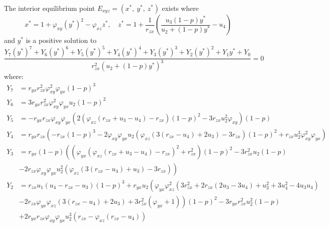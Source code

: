 \begin{theorem}\label{thm:eq-interior-exist}
    The interior equilibrium point $E_{xyz}=\left(x^*,\ y^*,\ z^*\right)$ exists where
    \begin{equation*}
        x^*=1+\varphi_{xy}\left(y^*\right)^2-\varphi_{xz}z^*,\quad 
        z^*=1+\frac{1}{r_{zx}}\left(\frac{u_3\left(1-p\right)y^*}{u_2+\left(1-p\right)y^*}-u_4\right)
    \end{equation*}
    and $y^*$ is a positive solution to 
    \begin{equation*}
        \frac{Y_7\left(y^*\right)^7+Y_6\left(y^*\right)^6+Y_5\left(y^*\right)^5+Y_4\left(y^*\right)^4+Y_3\left(y^*\right)^3+Y_2\left(y^*\right)^2+Y_1y^*+Y_0}{r_{zx}^2\left(u_2+\left(1-p\right)y^*\right)^3}=0
    \end{equation*}
    where:
    \begin{align*}
        Y_7 &= r_{yx}r_{zx}^2\varphi_{xy}^2\varphi_{yx}\left(1-p\right)^3\\
        Y_6 &= 3r_{yx}r_{zx}^2\varphi_{xy}^2\varphi_{yx}u_2\left(1-p\right)^2\\
        Y_5 &= -r_{yx}r_{zx}\varphi_{xy}\varphi_{yx}\left(2\left(\varphi_{xz}\left(r_{zx}+u_3-u_4\right)-r_{zx}\right)\left(1-p\right)^2-3r_{zx}u_2^2\varphi_{xy}\right)\left(1-p\right)\\
        Y_4 &= r_{yx}r_{zx}\left(-r_{zx}\left(1-p\right)^3-2\varphi_{xy}\varphi_{yx}u_2\left(\varphi_{xz}\left(3\left(r_{zx}-u_4\right)+2u_3\right)-3r_{zx}\right)\left(1-p\right)^2+r_{zx}u_2^3\varphi_{xy}^2\varphi_{yx}\right)\\
        Y_3 &= r_{yx}\left(1-p\right)\left(\left(\varphi_{yx}\left(\varphi_{xz}\left(r_{zx}+u_3-u_4\right)-r_{zx}\right)^2+r_{zx}^2\right)\left(1-p\right)^2-3r_{zx}^2u_2\left(1-p\right)\right.\\
        &\left.-2r_{zx}\varphi_{xy}\varphi_{yx}u_2^2\left(\varphi_{xz}\left(3\left(r_{zx}-u_4\right)+u_3\right)-3r_{zx}\right)\right)\\
        Y_2 &= r_{zx}u_1\left(u_4-r_{zx}-u_3\right)\left(1-p\right)^3+r_{yx}u_2\left(\varphi_{yx}\varphi_{xz}^2\left(3r_{zx}^2+2r_{zx}\left(2u_3-3u_4\right)+u_3^2+3u_4^2-4u_3u_4\right)\right.\\
        &\left.-2r_{zx}\varphi_{yx}\varphi_{xz}\left(3\left(r_{zx}-u_4\right)+2u_3\right)+3r_{zx}^2\left(\varphi_{yx}+1\right)\right)\left(1-p\right)^2-3r_{yx}r_{zx}^2u_2^2\left(1-p\right)\\
        &+2r_{yx}r_{zx}\varphi_{xy}\varphi_{yx}u_2^3\left(r_{zx}-\varphi_{xz}\left(r_{zx}-u_4\right)\right)\\

\end{align*}
\end{theorem}
